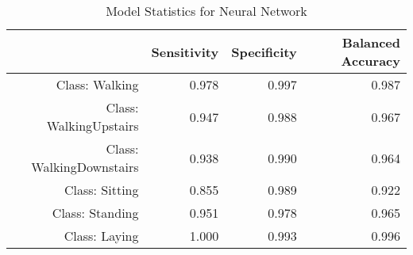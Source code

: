 \begin{table}[ht]
\centering
\caption{Model Statistics for Neural Network} 
\label{tab:conmat_stats_nn1}
\begin{tabular}{rrrr}
  \hline
 & Sensitivity & Specificity & Balanced Accuracy \\ 
  \hline
Class: Walking & 0.978 & 0.997 & 0.987 \\ 
  Class: WalkingUpstairs & 0.947 & 0.988 & 0.967 \\ 
  Class: WalkingDownstairs & 0.938 & 0.990 & 0.964 \\ 
  Class: Sitting & 0.855 & 0.989 & 0.922 \\ 
  Class: Standing & 0.951 & 0.978 & 0.965 \\ 
  Class: Laying & 1.000 & 0.993 & 0.996 \\ 
   \hline
\end{tabular}
\end{table}
